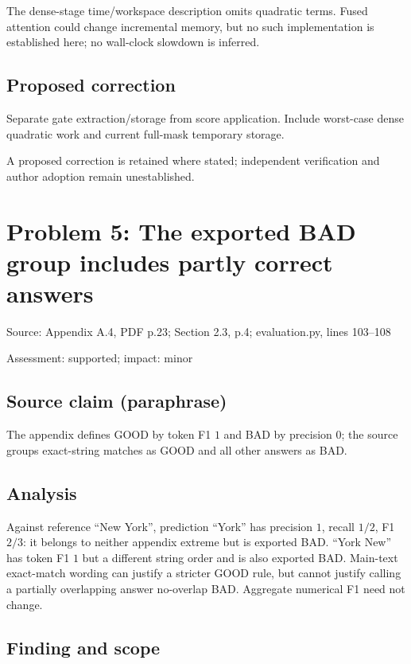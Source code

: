 \documentclass[11pt]{article}
\begin{document}
The dense-stage time/workspace description omits quadratic terms. Fused attention could change incremental memory, but no such implementation is established here; no wall-clock slowdown is inferred.

\subsection*{Proposed correction}

Separate gate extraction/storage from score application. Include worst-case dense quadratic work and current full-mask temporary storage.

A proposed correction is retained where stated; independent verification and author adoption remain unestablished.

\section*{Problem 5: The exported BAD group includes partly correct answers}

Source: Appendix A.4, PDF p.23; Section 2.3, p.4; evaluation.py, lines 103–108

Assessment: supported; impact: minor

\subsection*{Source claim (paraphrase)}

The appendix defines GOOD by token F1 \(1\) and BAD by precision \(0\); the source groups exact-string matches as GOOD and all other answers as BAD.

\subsection*{Analysis}

Against reference “New York”, prediction “York” has precision \(1\), recall \(1/2\), F1 \(2/3\): it belongs to neither appendix extreme but is exported BAD. “York New” has token F1 \(1\) but a different string order and is also exported BAD. Main-text exact-match wording can justify a stricter GOOD rule, but cannot justify calling a partially overlapping answer no-overlap BAD. Aggregate numerical F1 need not change.

\subsection*{Finding and scope}
\end{document}
